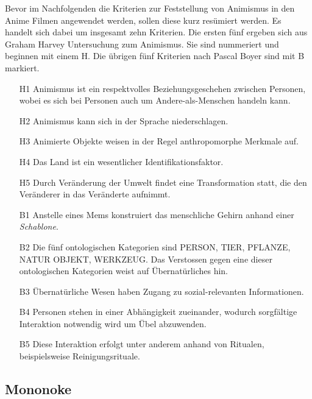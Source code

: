 Bevor im Nachfolgenden die Kriterien zur Feststellung von Animismus in den Anime Filmen angewendet werden, sollen diese kurz resümiert werden. Es handelt sich dabei um insgesamt zehn Kriterien. Die ersten fünf ergeben sich aus Graham Harvey Untersuchung zum Animismus. Sie sind nummeriert und beginnen mit einem H. Die übrigen fünf Kriterien nach Pascal Boyer sind mit B markiert.
\begin{itemize}
	\item [H1] Animismus ist ein respektvolles Beziehungsgeschehen zwischen Personen, wobei es sich bei Personen auch um Andere-als-Menschen handeln kann.
	\item [H2] Animismus kann sich in der Sprache niederschlagen.
	\item [H3] Animierte Objekte weisen in der Regel anthropomorphe Merkmale auf.
	\item [H4] Das Land ist ein wesentlicher Identifikationsfaktor.
	\item [H5] Durch Veränderung der Umwelt findet eine Transformation statt, die den Veränderer in das Veränderte aufnimmt.
	\item [B1] Anstelle eines Mems konstruiert das menschliche Gehirn anhand einer \emph{Schablone}.
	\item [B2] Die fünf ontologischen Kategorien sind PERSON, TIER, PFLANZE, NATUR OBJEKT, WERKZEUG. Das Verstossen gegen eine dieser ontologischen Kategorien weist auf Übernatürliches hin.
	\item [B3] Übernatürliche Wesen haben Zugang zu sozial-relevanten Informationen. 
	\item [B4] Personen stehen in einer Abhängigkeit zueinander, wodurch sorgfältige Interaktion notwendig wird um Übel abzuwenden.
	\item [B5] Diese Interaktion erfolgt unter anderem anhand von Ritualen, beispielsweise Reinigungsrituale.
\end{itemize} 

\subsection{Mononoke} 

